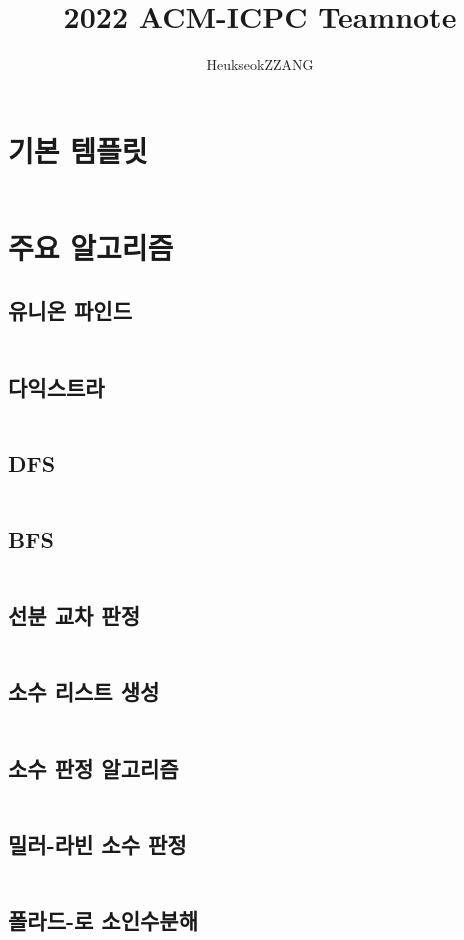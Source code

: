 \documentclass{article}
\begin{document}
	
\title{2022 ACM-ICPC Teamnote}
\author{HeukseokZZANG}
\maketitle

\tableofcontents

\section{기본 템플릿}
\inputminted{cpp}{codes/basic.cpp}

\section{주요 알고리즘}
\subsection{유니온 파인드}
\inputminted{cpp}{codes/unionfind.cpp}
\subsection{다익스트라}
\inputminted{cpp}{codes/dijkstra.cpp}
\subsection{DFS}
\inputminted{cpp}{codes/dfs.cpp}
\subsection{BFS}
\inputminted{cpp}{codes/bfs.cpp}
\subsection{선분 교차 판정}
\inputminted{cpp}{codes/linecross.cpp}
\subsection{소수 리스트 생성}
\inputminted{python}{codes/primelist.py}
\subsection{소수 판정 알고리즘}
\inputminted{python}{codes/primetest.py}
\subsection{밀러-라빈 소수 판정}
\inputminted{python}{codes/miller-rabin.py}
\subsection{폴라드-로 소인수분해}
\inputminted{python}{codes/pollard-rho.py}
\end{document}
